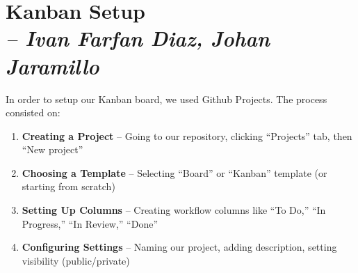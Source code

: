 \chapter{Kanban Setup \\
\small{\textit{-- Ivan Farfan Diaz, Johan Jaramillo}}
\label{Chapter::Kanban Setup}}

In order to setup our Kanban board, we used Github Projects. The process consisted on:

\begin{enumerate}
    \item \textbf{Creating a Project} -- Going to our repository, clicking ``Projects'' tab, then ``New project''
    
    \item \textbf{Choosing a Template} -- Selecting ``Board'' or ``Kanban'' template (or starting from scratch)
    
    \item \textbf{Setting Up Columns} -- Creating workflow columns like ``To Do,'' ``In Progress,'' ``In Review,'' ``Done''
    
    \item \textbf{Configuring Settings} -- Naming our project, adding description, setting visibility (public/private)
    
\end{enumerate}